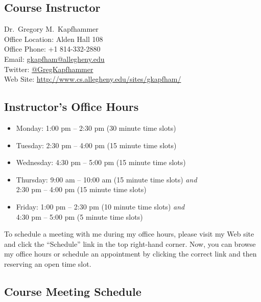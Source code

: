 

\usepackage[compact]{titlesec}



\subsection*{Course Instructor}
Dr.\ Gregory M.\ Kapfhammer\\
\noindent Office Location: Alden Hall 108 \\
\noindent Office Phone: +1 814-332-2880 \\
\noindent Email: \url{gkapfham@allegheny.edu} \\
\noindent Twitter: \url{@GregKapfhammer} \\
\noindent Web Site: \url{http://www.cs.allegheny.edu/sites/gkapfham/}

\subsection*{Instructor's Office Hours}

\begin{itemize}
    \itemsep 0em
    \item Monday: 1:00 pm -- 2:30 pm (30 minute time slots)
    \item Tuesday: 2:30 pm -- 4:00 pm (15 minute time slots)
    \item Wednesday: 4:30 pm -- 5:00 pm (15 minute time slots)
    \item Thursday: 9:00 am -- 10:00 am (15 minute time slots) {\em and} \\ \hspace*{.69in} 2:30 pm -- 4:00 pm (15 minute time slots)
    \item Friday: 1:00 pm -- 2:30 pm (10 minute time slots) {\em and} \\ \hspace*{.49in} 4:30 pm -- 5:00 pm (5 minute time slots)
\end{itemize}

\noindent
To schedule a meeting with me during my office hours, please visit my Web site and click the ``Schedule'' link in the
top right-hand corner. Now, you can browse my office hours or schedule an appointment by clicking the correct link and
then reserving an open time slot.

\subsection*{Course Meeting Schedule}

